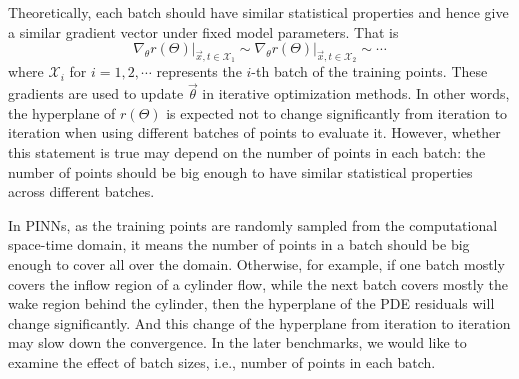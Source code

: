 Theoretically, each batch should have similar statistical properties and hence give a similar gradient vector under fixed model parameters.
That is
\begin{equation}
\left.\nabla_\theta r(\Theta) \right|_{\vec{x}, t \in \mathcal{X}_1} \sim
\left.\nabla_\theta r(\Theta) \right|_{\vec{x}, t \in \mathcal{X}_2} \sim
\cdots
\end{equation}
where $\mathcal{X}_i$ for $i=1,2,\cdots$ represents the $i$-th batch of the training points.
These gradients are used to update $\vec{\theta}$ in iterative optimization methods.
In other words, the hyperplane of $r(\Theta)$ is expected not to change significantly from iteration to iteration when using different batches of points to evaluate it.
However, whether this statement is true may depend on the number of points in each batch: the number of points should be big enough to have similar statistical properties across different batches.

In PINNs, as the training points are randomly sampled from the computational space-time domain, it means the number of points in a batch should be big enough to cover all over the domain.
Otherwise, for example, if one batch mostly covers the inflow region of a cylinder flow, while the next batch covers mostly the wake region behind the cylinder, then the hyperplane of the PDE residuals will change significantly.
And this change of the hyperplane from iteration to iteration may slow down the convergence.
In the later benchmarks, we would like to examine the effect of batch sizes, i.e., number of points in each batch. 

